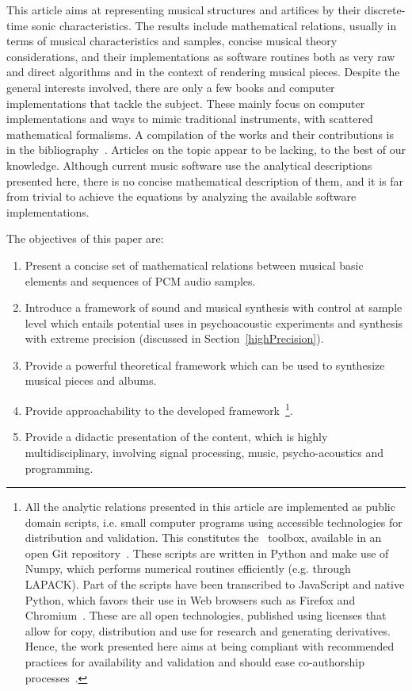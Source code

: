 This article aims at representing musical structures and artifices
by their discrete-time sonic characteristics.
The results include mathematical relations,
usually in terms of musical characteristics and samples,
concise musical theory considerations,
and their implementations as software routines both as
very raw and direct algorithms and in the context of rendering musical pieces.
Despite the general interests involved,
there are only a few books and computer implementations that tackle the subject.
These mainly focus on computer implementations and ways to mimic traditional instruments,
with scattered mathematical formalisms.
A compilation of the works and their contributions is in the bibliography~\cite{dissertacao}.
Articles on the topic appear to be lacking, to the best of our knowledge.
Although current music software use the analytical descriptions presented here,
there is no concise mathematical description of them, and it is far from trivial
to achieve the equations by analyzing the available software implementations.

The objectives of this paper are:

\begin{enumerate}
	\item Present a concise set of mathematical relations between musical basic elements and sequences of PCM audio samples.
	\item Introduce a framework of sound and musical synthesis with control at sample level which entails potential uses in psychoacoustic experiments and synthesis with extreme precision (discussed in Section~\ref{highPrecision}).
	\item Provide a powerful theoretical framework which can be used to synthesize musical pieces and albums.
	\item Provide approachability to the developed framework~\footnote{All
		the analytic relations presented in this article are implemented as public domain scripts,
		i.e. small computer programs using accessible technologies for distribution and validation.
		This constitutes the \massa\ toolbox, available in an open Git repository~\cite{gitBook}.
		These scripts are written in Python and make use of Numpy,
		which performs numerical routines efficiently (e.g. through LAPACK).
		Part of the scripts have been transcribed to JavaScript and native Python,
		which favors their use in Web browsers such as Firefox and
		Chromium~\cite{numpy, audiolab, tutpython, python}.
		These are all open technologies, published using licenses that allow for copy,
		distribution and use for research and generating derivatives.
		Hence, the work presented here aims at being compliant with recommended
		practices for availability and validation
		and should ease co-authorship processes~\cite{Raymond,Lessig}.}.
	\item Provide a didactic presentation of the content, which is highly multidisciplinary,
		involving signal processing, music, psycho-acoustics and programming.
\end{enumerate}

